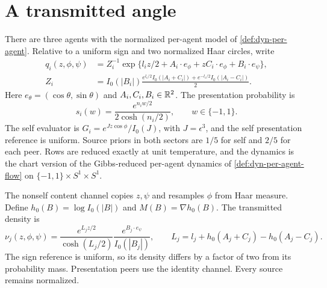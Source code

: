 \section{A transmitted angle}

There are three agents with the normalized per-agent model of \cref{def:dyn-per-agent}. Relative to a uniform sign and two normalized Haar circles, write
\begin{align}
 q_i(z,\phi,\psi)&=Z_i^{-1}
 \exp\{l_i z/2+A_i\cdot e_\phi+zC_i\cdot e_\phi+B_i\cdot e_\psi\},
 \label{lp:law}\\
 Z_i&=I_0(|B_i|)
 \frac{e^{l_i/2}I_0(|A_i+C_i|)+e^{-l_i/2}I_0(|A_i-C_i|)}2.
 \nonumber
\end{align}
Here $e_\theta=(\cos\theta,\sin\theta)$ and $A_i,C_i,B_i\in\mathbb R^2$. The presentation probability is
\begin{equation}
 s_i(w)=\frac{e^{n_iw/2}}{2\cosh(n_i/2)},\qquad w\in\{-1,1\}.
 \label{lp:presentation}
\end{equation}
The self evaluator is $G_i=e^{Jz\cos\phi}/I_0(J)$, with $J=\epsilon^3$, and the self presentation reference is uniform. Source priors in both sectors are $1/5$ for self and $2/5$ for each peer. Rows are reduced exactly at unit temperature, and the dynamics is the chart version of the Gibbs-reduced per-agent dynamics of \cref{def:dyn-per-agent-flow} on $\{-1,1\}\times S^1\times S^1$.

The nonself content channel copies $z,\psi$ and resamples $\phi$ from Haar measure. Define $h_0(B)=\log I_0(|B|)$ and $M(B)=\nabla h_0(B)$. The transmitted density is
\begin{equation}
 \nu_j(z,\phi,\psi)=\frac{e^{L_jz/2}}{\cosh(L_j/2)}
 \frac{e^{B_j\cdot e_\psi}}{I_0(|B_j|)},\qquad
 L_j=l_j+h_0(A_j+C_j)-h_0(A_j-C_j).
 \label{lp:peer}
\end{equation}
The sign reference is uniform, so its density differs by a factor of two from its probability mass. Presentation peers use the identity channel. Every source remains normalized.

